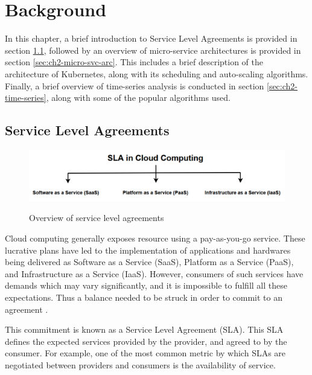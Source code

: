 \clearpage

\def\chaptertitle{Background}

\lhead{\emph{\chaptertitle}}

\chapter{\chaptertitle}
\label{ch:background}

In this chapter, a brief introduction to Service Level Agreements is provided in section \ref{sec:ch2-sla}, followed by an overview of micro-service architectures is provided in section \ref{sec:ch2-micro-svc-arc}. This includes a brief description of the architecture of Kubernetes, along with its scheduling and auto-scaling algorithms. Finally, a brief overview of time-series analysis is conducted in section \ref{sec:ch2-time-series}, along with some of the popular algorithms used.

\section{Service Level Agreements}
\label{sec:ch2-sla}

\begin{figure}[htb]
    \centering
    \caption{Overview of service level agreements}
    \includegraphics[width=0.9\linewidth]{Figures/SLA-Cloud-Computing.pdf}
    \label{fig:sla-types}
\end{figure}

Cloud computing generally exposes resource using a pay-as-you-go service. These lucrative plans have led to the implementation of applications and hardwares being delivered as Software as a Service (SaaS), Platform as a Service (PaaS), and Infrastructure as a Service (IaaS). However, consumers of such services have demands which may vary significantly, and it is impossible to fulfill all these expectations. Thus a balance needed to be struck in order to commit to an agreement \cite{patel2009service}. \par
This commitment is known as a Service Level Agreement (SLA). This SLA defines the expected services provided by the provider, and agreed to by the consumer. For example, one of the most common metric by which SLAs are negotiated between providers and consumers is the availability of service.

